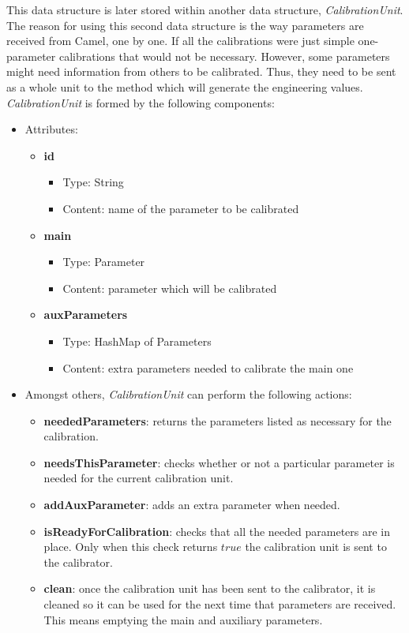 This data structure is later stored within another data structure, \emph{CalibrationUnit}. The reason for using this second data structure is the way parameters are received from Camel, one by one. If all the calibrations were just simple one-parameter calibrations that would not be necessary. However, some parameters might need information from others to be calibrated. Thus, they need to be sent as a whole unit to the method which will generate the engineering values. \emph{CalibrationUnit} is formed by the following components:

\begin{itemize}
\item Attributes:
	\begin{itemize}
		\item \textbf{id}
			\begin{itemize}
				\item Type: String
				\item Content: name of the parameter to be calibrated
			\end{itemize}
		\item \textbf{main}
			\begin{itemize}
				\item Type: Parameter
				\item Content: parameter which will be calibrated
			\end{itemize}				
		\item \textbf{auxParameters}
			\begin{itemize}
				\item Type: HashMap of Parameters
				\item Content: extra parameters needed to calibrate the main one
			\end{itemize}												
		
	\end{itemize}
	
	\item Amongst others, \emph{CalibrationUnit} can perform the following actions:
	\begin{itemize}
		\item \textbf{neededParameters}: returns the parameters listed as necessary for the calibration.
		\item \textbf{needsThisParameter}: checks whether or not a particular parameter is needed for the current calibration unit.
		\item \textbf{addAuxParameter}: adds an extra parameter when needed.
		\item \textbf{isReadyForCalibration}: checks that all the needed parameters are in place. Only when this check returns $true$ the calibration unit is sent to the calibrator.
		\item \textbf{clean}: once the calibration unit has been sent to the calibrator, it is cleaned so it can be used for the next time that parameters are received. This means emptying the main and auxiliary parameters.
	\end{itemize}

\end{itemize}


